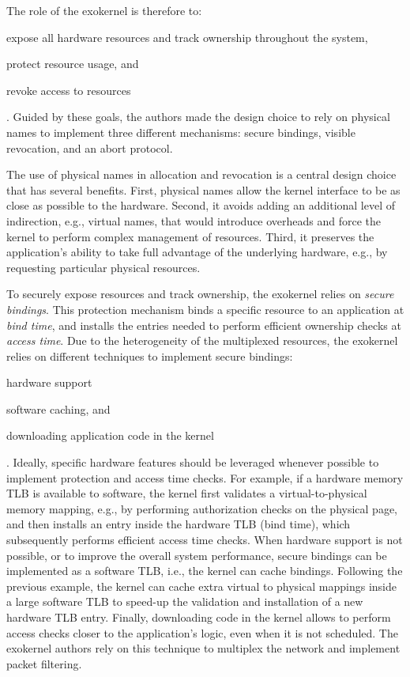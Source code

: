 The role of the exokernel is therefore to:
\begin{enumerate*}
	\item \label{expose} expose all hardware resources and track ownership throughout the system,
	\item \label{protect} protect resource usage, and
	\item \label{revoke} revoke access to resources
\end{enumerate*}.
Guided by these goals, the authors made the design choice to rely on physical names to implement three different mechanisms: secure bindings, visible revocation, and an abort protocol.

The use of physical names in allocation and revocation is a central design choice that has several benefits.
First, physical names allow the kernel interface to be as close as possible to the hardware.
Second, it avoids adding an additional level of indirection, e.g., virtual names, that would introduce overheads and force the kernel to perform complex management of resources.
Third, it preserves the application's ability to take full advantage of the underlying hardware, e.g., by requesting particular physical resources.

To securely expose resources and track ownership, the exokernel relies on \emph{secure bindings}.
This protection mechanism binds a specific resource to an application at \emph{bind time}, and installs the entries needed to perform efficient ownership checks at \emph{access time}.
Due to the heterogeneity of the multiplexed resources, the exokernel relies on different techniques to implement secure bindings:
\begin{enumerate*}
	\item hardware support
	\item software caching, and
	\item downloading application code in the kernel
\end{enumerate*}.
Ideally, specific hardware features should be leveraged whenever possible to implement protection and access time checks.
For example, if a hardware memory TLB is available to software, the kernel first validates a virtual-to-physical memory mapping, e.g., by performing authorization checks on the physical page, and then installs an entry inside the hardware TLB (bind time), which subsequently performs efficient access time checks.
When hardware support is not possible, or to improve the overall system performance, secure bindings can be implemented as a software TLB, i.e., the kernel can cache bindings.
Following the previous example, the kernel can cache extra virtual to physical mappings inside a large software TLB to speed-up the validation and installation of a new hardware TLB entry.
Finally, downloading code in the kernel allows to perform access checks closer to the application's logic, even when it is not scheduled.
The exokernel authors rely on this technique to multiplex the network and implement packet filtering.

